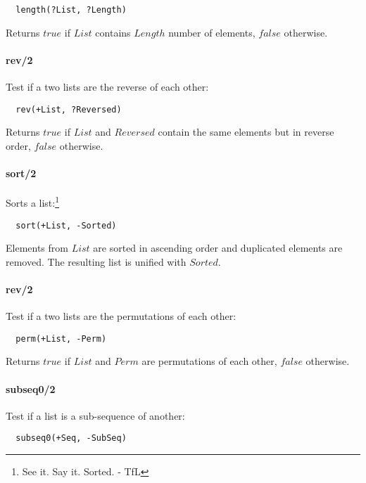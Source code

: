 \documentclass{article}
\begin{document}
\begin{multicols}{2}
  \begin{lstlisting}
  length(?List, ?Length)
  \end{lstlisting} 
  
  Returns $true$ if $List$ contains $Length$ number of elements, $false$ otherwise.
  
  \paragraph{rev/2} Test if a two lists are the reverse of each other:
  
  \begin{lstlisting}
  rev(+List, ?Reversed)
  \end{lstlisting} 
  
  Returns $true$ if $List$ and $Reversed$ contain the same elements but in reverse order, $false$ otherwise.
  
  \paragraph{sort/2} Sorts a list:\footnote{See it. Say it. Sorted. - TfL}
  
  \begin{lstlisting}
  sort(+List, -Sorted)
  \end{lstlisting} 
  
  Elements from $List$ are sorted in ascending order and duplicated elements are removed. The resulting list is unified with $Sorted$.
  
  \paragraph{rev/2} Test if a two lists are the permutations of each other:
  
  \begin{lstlisting}
  perm(+List, -Perm)
  \end{lstlisting} 
  
  Returns $true$ if $List$ and $Perm$ are permutations of each other, $false$ otherwise.
  
  \paragraph{subseq0/2} Test if a list is a sub-sequence of another:
  
  \begin{lstlisting}
  subseq0(+Seq, -SubSeq)
  \end{lstlisting} 
  

\end{multicols}
\end{document}
